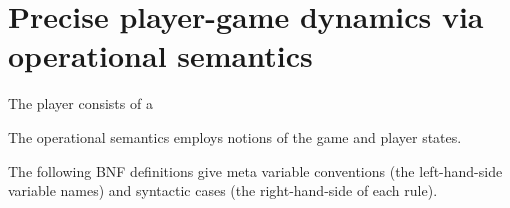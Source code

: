 \newcommand{\Player}[4]{\ensuremath{#1{:}\left< {#2} , {#3} , {#4} \right>}}
\newcommand{\PropIsTrue}[2]{\ensuremath{#1 \vdash #2~\textsf{true}}}
\newcommand{\StepsTo}[4]{\ensuremath{\left< #1 ; #2 \right> \longrightarrow \left< #3 ; #4 \right>}}

\section{Precise player-game dynamics via operational semantics}
\label{sec:opsem}

The player consists of a 

The operational semantics employs notions of the game and player states.

The following BNF definitions give meta variable conventions (the left-hand-side variable names) and syntactic cases (the right-hand-side of each rule).


